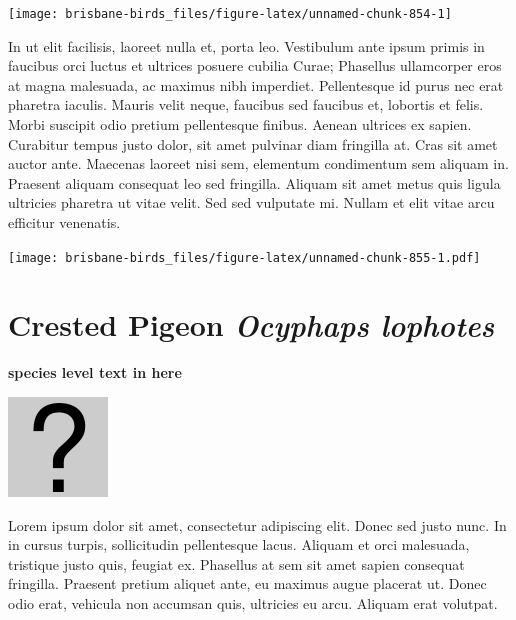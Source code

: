 \documentclass[]{book}
\let\origfigure\figure
\let\endorigfigure\endfigure
\renewenvironment{figure}[1][2] {
  \expandafter\origfigure\expandafter[H]
} {
  \endorigfigure
}
\begin{document}
\begin{figure}
\texttt{[image: brisbane-birds\_files/figure-latex/unnamed-chunk-854-1]} \caption{insert figure caption}\label{fig:unnamed-chunk-854}
\end{figure}

In ut elit facilisis, laoreet nulla et, porta leo. Vestibulum ante ipsum
primis in faucibus orci luctus et ultrices posuere cubilia Curae;
Phasellus ullamcorper eros at magna malesuada, ac maximus nibh
imperdiet. Pellentesque id purus nec erat pharetra iaculis. Mauris velit
neque, faucibus sed faucibus et, lobortis et felis. Morbi suscipit odio
pretium pellentesque finibus. Aenean ultrices ex sapien. Curabitur
tempus justo dolor, sit amet pulvinar diam fringilla at. Cras sit amet
auctor ante. Maecenas laoreet nisi sem, elementum condimentum sem
aliquam in. Praesent aliquam consequat leo sed fringilla. Aliquam sit
amet metus quis ligula ultricies pharetra ut vitae velit. Sed sed
vulputate mi. Nullam et elit vitae arcu efficitur venenatis.

\begin{figure}
\centering
\texttt{[image: brisbane-birds\_files/figure-latex/unnamed-chunk-855-1.pdf]}
\caption{\label{fig:unnamed-chunk-855}insert figure caption}
\end{figure}

\section{\texorpdfstring{Crested Pigeon \emph{Ocyphaps
lophotes}}{Crested Pigeon Ocyphaps lophotes}}\label{crested-pigeon-ocyphaps-lophotes}

\textbf{species level text in here}

\begin{figure}
\centering
\includegraphics{assets/missing.png}
\caption{No image for species}
\end{figure}

Lorem ipsum dolor sit amet, consectetur adipiscing elit. Donec sed justo
nunc. In in cursus turpis, sollicitudin pellentesque lacus. Aliquam et
orci malesuada, tristique justo quis, feugiat ex. Phasellus at sem sit
amet sapien consequat fringilla. Praesent pretium aliquet ante, eu
maximus augue placerat ut. Donec odio erat, vehicula non accumsan quis,
ultricies eu arcu. Aliquam erat volutpat.
\end{document}
